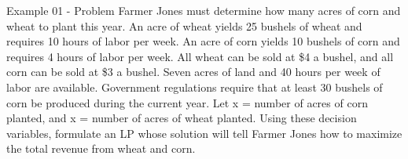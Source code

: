 \begin{frame}{Example 01 - Problem}
Farmer Jones must determine how many acres of corn and wheat to plant this year.
An acre of wheat yields 25 bushels of wheat and requires 10 hours of labor per
week. An acre of corn yields 10 bushels of corn and requires 4 hours of labor
per week. All wheat can be sold at \$4 a bushel, and all corn can be sold at
\$3 a bushel. Seven acres of land and 40 hours per week of labor are available.
Government regulations require that at least 30 bushels of corn be produced
during the current year. Let x = number of acres of corn planted,
and x = number of acres of wheat planted. Using these decision
variables, formulate an LP whose solution will tell Farmer Jones how to maximize
the total revenue from wheat and corn.
\end{frame}
